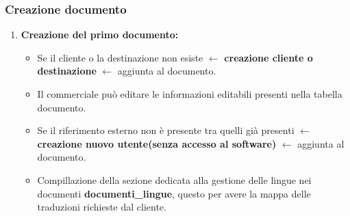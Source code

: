\documentclass[12pt, a4paper]{article}
\begin{document}
\subsubsection{Creazione documento}
\begin{enumerate}
    \item \textbf{Creazione del primo documento:}
          \begin{itemize}
              \item Se il cliente o la destinazione non esiste \(\leftarrow\) \textbf{creazione cliente o destinazione} \(\leftarrow\) aggiunta al documento.
              \item Il commerciale può editare le informazioni editabili presenti nella tabella documento.
              \item Se il riferimento esterno non è presente tra quelli già presenti \(\leftarrow\) \textbf{creazione nuovo utente(senza accesso al software)} \(\leftarrow\) aggiunta al documento.
              \item Compillazione della sezione dedicata alla gestione delle lingue nei documenti \textbf{documenti\_lingue}, questo per avere la mappa delle traduzioni richieste dal cliente.
          \end{itemize}


\end{enumerate}
\end{document}

